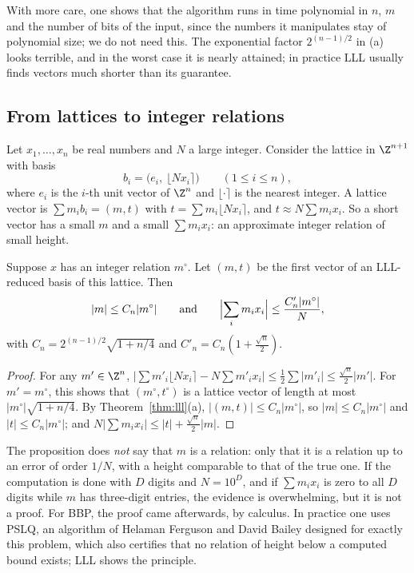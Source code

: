 With more care, one shows that the algorithm runs in time polynomial in $n$, $m$ and the number of bits of the input, since the numbers it manipulates stay of
polynomial size; we do not need this. The exponential factor $2^{(n-1)/2}$ in (a) looks terrible, and in the worst case it is nearly attained; in practice
LLL usually finds vectors much shorter than its guarantee.

\subsection*{From lattices to integer relations}

Let $x_1,\dots,x_n$ be real numbers and $N$ a large integer. Consider the lattice in $\Z^{n+1}$ with basis
\[
b_i=\bigl(e_i,\ \lfloor Nx_i\rceil\bigr)\qquad(1\le i\le n),
\]
where $e_i$ is the $i$-th unit vector of $\Z^n$ and $\lfloor\cdot\rceil$ is the nearest integer. A lattice vector is $\sum m_ib_i=(m,t)$ with $t=\sum m_i\lfloor Nx_i\rceil$, and $t\approx N\sum m_ix_i$. So a short vector has a small
$m$ and a small $\sum m_ix_i$: an approximate integer relation of small height.

\begin{proposition}\label{prop:relation}
Suppose $x$ has an integer relation $m^\circ$. Let $(m,t)$ be the first vector of an LLL-reduced basis of this lattice. Then
\[
|m|\le C_n|m^\circ|\qquad\text{and}\qquad\Bigl|\sum_im_ix_i\Bigr|\le\frac{C_n'|m^\circ|}N,
\]
with $C_n=2^{(n-1)/2}\sqrt{1+n/4}$ and $C'_n=C_n(1+\frac{\sqrt n}2)$.
\end{proposition}

\begin{proof}
For any $m'\in\Z^n$, $|\sum m'_i\lfloor Nx_i\rceil-N\sum m'_ix_i|\le\frac12\sum|m'_i|\le\frac{\sqrt n}2|m'|$. For $m'=m^\circ$, this shows that $(m^\circ,t^\circ)$ is a lattice vector of length at most
$|m^\circ|\sqrt{1+n/4}$. By Theorem~\ref{thm:lll}(a), $|(m,t)|\le C_n|m^\circ|$, so $|m|\le C_n|m^\circ|$ and $|t|\le C_n|m^\circ|$; and $N|\sum m_ix_i|\le|t|+\frac{\sqrt n}2|m|$.
\end{proof}

The proposition does \emph{not} say that $m$ is a relation: only that it is a relation up to an error of order $1/N$, with a height comparable to that of the true one.
If the computation is done with $D$ digits and $N=10^D$, and if $\sum m_ix_i$ is zero to all $D$ digits while $m$ has three-digit entries, the evidence is overwhelming, but it is not a
proof. For BBP, the proof came afterwards, by calculus. In practice one uses PSLQ, an algorithm of Helaman Ferguson and David Bailey designed for exactly
this problem, which also certifies that no relation of height below a computed bound exists; LLL shows the principle.

